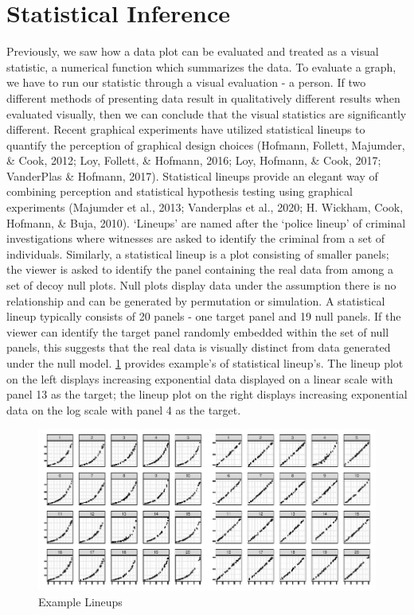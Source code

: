 \documentclass[print]{nuthesis}
\begin{document}
\hypertarget{statistical-inference}{%
\section{Statistical Inference}\label{statistical-inference}}

Previously, we saw how a data plot can be evaluated and treated as a visual statistic, a numerical function which summarizes the data.
To evaluate a graph, we have to run our statistic through a visual evaluation - a person.
If two different methods of presenting data result in qualitatively different results when evaluated visually, then we can conclude that the visual statistics are significantly different.
Recent graphical experiments have utilized statistical lineups to quantify the perception of graphical design choices (Hofmann, Follett, Majumder, \& Cook, 2012; Loy, Follett, \& Hofmann, 2016; Loy, Hofmann, \& Cook, 2017; VanderPlas \& Hofmann, 2017).
Statistical lineups provide an elegant way of combining perception and statistical hypothesis testing using graphical experiments (Majumder et al., 2013; Vanderplas et al., 2020; H. Wickham, Cook, Hofmann, \& Buja, 2010).
`Lineups' are named after the `police lineup' of criminal investigations where witnesses are asked to identify the criminal from a set of individuals.
Similarly, a statistical lineup is a plot consisting of smaller panels; the viewer is asked to identify the panel containing the real data from among a set of decoy null plots.
Null plots display data under the assumption there is no relationship and can be generated by permutation or simulation.
A statistical lineup typically consists of 20 panels - one target panel and 19 null panels.
If the viewer can identify the target panel randomly embedded within the set of null panels, this suggests that the real data is visually distinct from data generated under the null model.
\cref{fig:lineup-example} provides example's of statistical lineup's.
The lineup plot on the left displays increasing exponential data displayed on a linear scale with panel 13 as the target; the lineup plot on the right displays increasing exponential data on the log scale with panel 4 as the target.

\begin{figure}[tbp]

{\centering \includegraphics[width=\linewidth,]{thesis_files/figure-latex/lineup-example-1} 

}

\caption{Example Lineups}\label{fig:lineup-example}
\end{figure}
\end{document}
